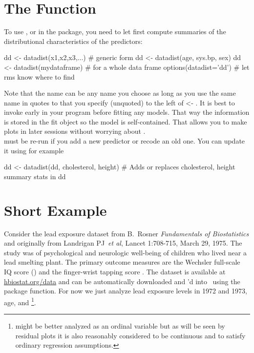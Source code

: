 \section{The   Function}%
\ipacue
To use , or  in the 
  package, you need to let  first compute summaries of the
  distributional characteristics of the predictors:
\begin{Schunk}
\begin{Sinput}
dd <- datadist(x1,x2,x3,...)   # generic form
dd <- datadist(age, sys.bp, sex)
dd <- datadist(mydataframe)    # for a whole data frame
options(datadist='dd')         # let rms know where to find
\end{Sinput}
\end{Schunk}
Note that the name  can be any name you choose as long as you
use the same name in quotes to  that you specify
(unquoted) to the left of <- .  It is best to
invoke  early in your program before fitting any
models.  That way the  information is stored in the fit
  object so the model is self-contained.  That allows you to make
  plots in later sessions without worrying about .  \\
 must be re-run if you add a new predictor or recode an
old one.  You can update it using for example
\begin{Schunk}
\begin{Sinput}
dd <- datadist(dd, cholesterol, height)
# Adds or replaces cholesterol, height summary stats in dd
\end{Sinput}
\end{Schunk}

\section{Short Example}\ipacue{}
Consider the lead exposure dataset from B.\ Rosner \emph{Fundamentals
  of Biostatistics} and originally from Landrigan PJ~\emph{et al}, Lancet
1:708-715, March 29, 1975.  The study was of psychological and
neurologic well-being of children who lived near a lead smelting
plant.  The primary outcome measures are the Wechsler full-scale IQ
score () and the finger-wrist tapping score .  The
dataset is available at \url{hbiostat.org/data}
and can be automatically downloaded and 'd into \R\ using
the  package  function.  For now we just
analyze lead exposure levels in 1972 and 1973, age, and
\footnote{ might be better analyzed as an
  ordinal variable but as will be seen by residual plots it is also
  reasonably considered to be continuous and to satisfy ordinary
  regression assumptions.}.

